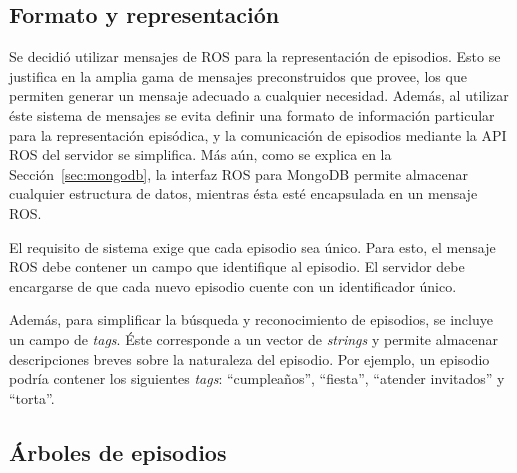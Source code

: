 \subsection{Formato y representación}

Se decidió utilizar mensajes de ROS para la representación de episodios. Esto se justifica en la amplia gama de mensajes preconstruidos que provee, los que permiten generar un mensaje adecuado a cualquier necesidad. Además, al utilizar éste sistema de mensajes se evita definir una formato de información particular para la representación episódica, y la comunicación de episodios mediante la API ROS del servidor se simplifica. Más aún, como se explica en la Sección~\ref{sec:mongodb}, la interfaz ROS para MongoDB permite almacenar cualquier estructura de datos, mientras ésta esté encapsulada en un mensaje ROS.

El requisito de sistema  exige que cada episodio sea único. Para esto, el mensaje ROS debe contener un campo que identifique al episodio. El servidor debe encargarse de que cada nuevo episodio cuente con un identificador único.

Además, para simplificar la búsqueda y reconocimiento de episodios, se incluye un campo de \textit{tags}. Éste corresponde a un vector de \textit{strings} y permite almacenar descripciones breves sobre la naturaleza del episodio. Por ejemplo, un episodio podría contener los siguientes \textit{tags}: ``cumpleaños'', ``fiesta'', ``atender invitados'' y ``torta''.

 
\subsection{Árboles de episodios}

